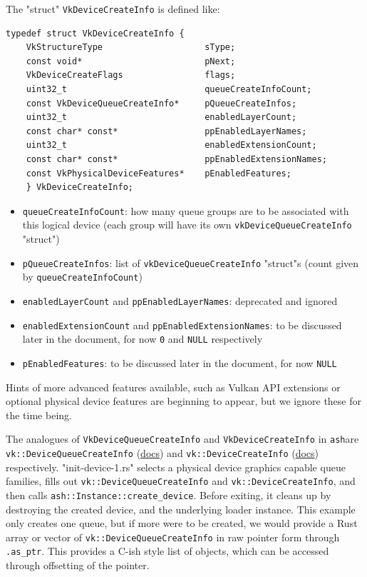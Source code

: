 \documentclass[12pt,letterpaper]{article}
\newcommand{\ril}[1]{\texttt{#1}}
\newcommand{\cil}[1]{\texttt{#1}}
\newcommand{\ash}{\texttt{ash}}
\begin{document}
	The "struct" \cil{VkDeviceCreateInfo} is defined like:
    \begin{verbatim}
typedef struct VkDeviceCreateInfo {
    VkStructureType                    sType;
    const void*                        pNext;
    VkDeviceCreateFlags                flags;
    uint32_t                           queueCreateInfoCount;
    const VkDeviceQueueCreateInfo*     pQueueCreateInfos;
    uint32_t                           enabledLayerCount;
    const char* const*                 ppEnabledLayerNames;
    uint32_t                           enabledExtensionCount;
    const char* const*                 ppEnabledExtensionNames;
    const VkPhysicalDeviceFeatures*    pEnabledFeatures;
    } VkDeviceCreateInfo;
\end{verbatim}
	\begin{itemize}
		\item \cil{queueCreateInfoCount}: how many queue groups are to be associated with this logical device (each group will have its own \cil{vkDeviceQueueCreateInfo} "struct")
			
		\item \cil{pQueueCreateInfos}: list of \cil{vkDeviceQueueCreateInfo} "struct"s (count given by \cil{queueCreateInfoCount})
			
		\item \cil{enabledLayerCount} and \cil{ppEnabledLayerNames}: deprecated and ignored
			
   		\item \cil{enabledExtensionCount} and \cil{ppEnabledExtensionNames}: to be discussed later in the document, for now \cil{0} and \cil{NULL} respectively
   		
   		\item \cil{pEnabledFeatures}: to be discussed later in the document, for now \cil{NULL}
   	\end{itemize}
	
    Hints of more advanced features available, such as Vulkan API extensions or optional physical device features are beginning to appear, but we ignore these for the time being.
		
	The analogues of \cil{VkDeviceQueueCreateInfo} and \cil{VkDeviceCreateInfo} in \ash are \ril{vk::DeviceQueueCreateInfo} (\href{https://docs.rs/ash/0.20.2/ash/vk/types/struct.DeviceQueueCreateInfo.html}{docs}) and \ril{vk::DeviceCreateInfo} (\href{https://docs.rs/ash/0.20.2/ash/vk/types/struct.DeviceCreateInfo.html}{docs}) respectively. "init-device-1.rs" selects a physical device graphics capable queue families, fills out \ril{vk::DeviceQueueCreateInfo} and \ril{vk::DeviceCreateInfo}, and then calls \ril{ash::Instance::create_device}. Before exiting, it cleans up by destroying the created device, and the underlying loader instance. This example only creates one queue, but if more were to be created, we would provide a Rust array or vector of \ril{vk::DeviceQueueCreateInfo} in raw pointer form through \ril{.as_ptr}. This provides a C-ish style list of objects, which can be accessed through offsetting of the pointer.
		
\end{document}
